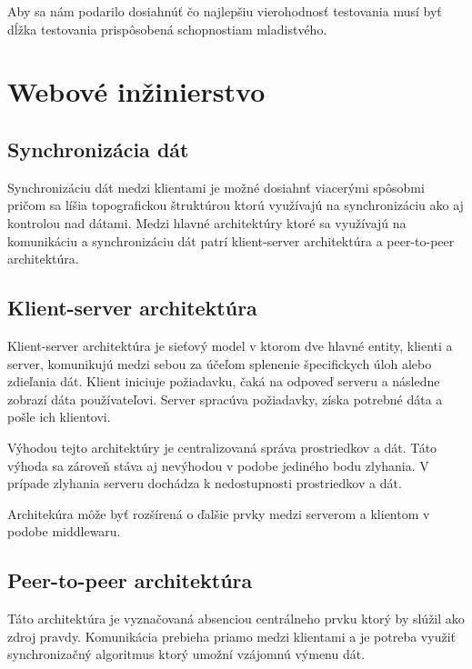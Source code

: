 Aby sa nám podarilo dosiahnúť čo najlepšiu vierohodnosť testovania musí byť dĺžka testovania prispôsobená schopnostiam mladistvého. \cite{usability_children}



\section{Webové inžinierstvo}


\subsection{Synchronizácia dát}
Synchronizáciu dát medzi klientami je možné dosiahnť viacerými spôsobmi pričom sa líšia topografickou štruktúrou ktorú využívajú na synchronizáciu ako aj kontrolou nad dátami. Medzi hlavné architektúry ktoré sa využívajú na komunikáciu a synchronizáciu dát patrí klient-server architektúra a peer-to-peer architektúra.

\subsection{Klient-server architektúra}
Klient-server architektúra je sieťový model v ktorom dve hlavné entity, klienti a server, komunikujú medzi sebou za účeľom splenenie špecifickych úloh alebo zdieľania dát. Klient iniciuje požiadavku, čaká na odpoveď serveru a následne zobrazí dáta používateľovi. Server spracúva požiadavky, získa potrebné dáta a pošle ich klientovi. 

Výhodou tejto architektúry je centralizovaná správa prostriedkov a dát. Táto výhoda sa zároveň stáva aj nevýhodou v podobe jediného bodu zlyhania. V prípade zlyhania serveru dochádza k nedostupnosti prostriedkov a dát.

Architekúra môže byť rozšírená o ďalšie prvky medzi serverom a klientom v podobe middlewaru.
\cite{client_server}



\subsection{Peer-to-peer architektúra}
Táto architektúra je vyznačovaná absenciou centrálneho prvku ktorý by slúžil ako zdroj pravdy. Komunikácia prebieha priamo medzi klientami a je potreba využiť synchronizačný algoritmus ktorý umožní vzájomnú výmenu dát.

